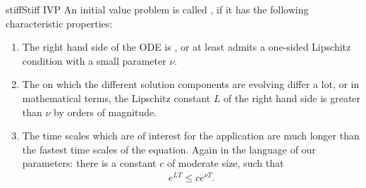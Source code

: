 \begin{Definition}{stiff}{Stiff IVP}
  An initial value problem is called , if it has
	the following characteristic properties:
  \begin{enumerate}
  \item The right hand side of the ODE is , or at
    least admits a one-sided Lipschitz condition with a small
    parameter $\nu$.
  \item The  on which the different solution
    components are evolving differ a lot, or in mathematical terms,
    the Lipschitz constant $L$ of the right hand side is greater than
    $\nu$ by orders of magnitude.
  \item The time scales which are of interest for the application 
    are much longer than the fastest time scales of the equation. Again
    in the language of our parameters: there is a constant $c$ of
    moderate size, such that
    \begin{gather}
      \label{eq:implicit:7}
      e^{LT} \le c e^{\nu T}.
    \end{gather}
  \end{enumerate}
\end{Definition}

